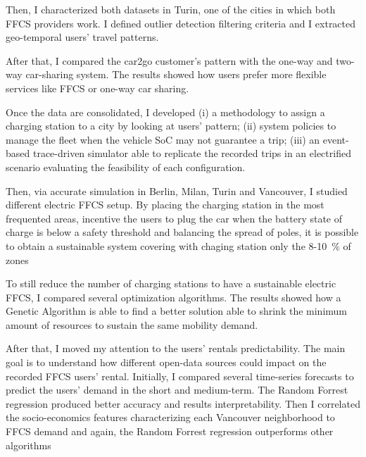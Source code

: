 \documentclass[%
   corpo=12pt, %
   oneside, %
   tipotesi=scudo,
   mybibliostyle, %
  numerazioneromana, %
   ]{toptesi}
\begin{document}
Then, I characterized both datasets in Turin, one of the cities in which both FFCS providers work. I defined outlier detection filtering criteria and I extracted geo-temporal users' travel patterns.

After that, I compared the car2go customer's pattern with the one-way and two-way car-sharing system. The results showed how users prefer more flexible services like FFCS or one-way car sharing.

Once the data are consolidated, I developed (i) a methodology to assign a charging station to a city by looking at users' pattern; (ii) system policies to manage the fleet when the vehicle SoC may not guarantee a trip; (iii) an event-based trace-driven simulator able to replicate the recorded trips in an electrified scenario evaluating the feasibility of each configuration. 


Then, via accurate simulation in Berlin, Milan, Turin and Vancouver, I studied different electric FFCS setup. By placing the charging station in the most frequented areas, incentive the users to plug the car when the battery state of charge is below a safety threshold and balancing the spread of poles, it is possible to obtain a sustainable system covering with chaging station only the 8-10~\% of zones


To still reduce the number of charging stations to have a sustainable electric FFCS, I compared several optimization algorithms. The results showed how a Genetic Algorithm is able to find a better solution able to shrink the minimum amount of resources to sustain the same mobility demand.

After that, I moved my attention to the users' rentals predictability. The main goal is to understand how different open-data sources could impact on the recorded FFCS users' rental. Initially, I compared several time-series forecasts to predict the users' demand in the short and medium-term. The Random Forrest regression produced better accuracy and results interpretability. Then I correlated the socio-economics features characterizing each Vancouver neighborhood to FFCS demand and again, the Random Forrest regression outperforms other algorithms
\end{document}

